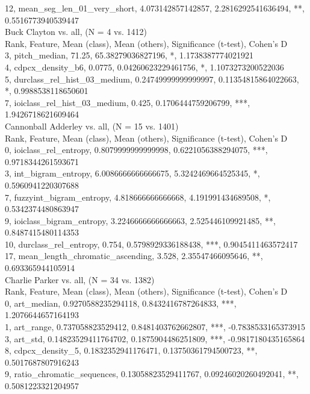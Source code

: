 12, mean_seg_len_01_very_short, 4.073142857142857, 2.2816292541636494, **, 0.5516773940539447\\
Buck Clayton vs. all, (N = 4 vs. 1412)\\
Rank, Feature, Mean (class), Mean (others), Significance (t-test), Cohen's D\\
3, pitch_median, 71.25, 65.38279036827196, *, 1.1738387774021921\\
4, cdpcx_density_b6, 0.0775, 0.04260623229461756, *, 1.1073273200522036\\
5, durclass_rel_hist_03_medium, 0.24749999999999997, 0.11354815864022663, *, 0.9988538118650601\\
7, ioiclass_rel_hist_03_medium, 0.425, 0.1706444759206799, ***, 1.9426718621609464\\
Cannonball Adderley vs. all, (N = 15 vs. 1401)\\
Rank, Feature, Mean (class), Mean (others), Significance (t-test), Cohen's D\\
0, ioiclass_rel_entropy, 0.8079999999999998, 0.6221056388294075, ***, 0.9718344261593671\\
3, int_bigram_entropy, 6.0086666666666675, 5.3242469664525345, *, 0.5960941220307688\\
7, fuzzyint_bigram_entropy, 4.818666666666668, 4.191991434689508, *, 0.5342374480863947\\
9, ioiclass_bigram_entropy, 3.2246666666666663, 2.525446109921485, **, 0.8487415480114353\\
10, durclass_rel_entropy, 0.754, 0.5798929336188438, ***, 0.9045411463572417\\
17, mean_length_chromatic_ascending, 3.528, 2.35547466095646, **, 0.693365944105914\\
Charlie Parker vs. all, (N = 34 vs. 1382)\\
Rank, Feature, Mean (class), Mean (others), Significance (t-test), Cohen's D\\
0, art_median, 0.9270588235294118, 0.8432416787264833, ***, 1.2076644657164193\\
1, art_range, 0.737058823529412, 0.8481403762662807, ***, -0.7838533165373915\\
3, art_std, 0.14823529411764702, 0.1875904486251809, ***, -0.9817180435165864\\
8, cdpcx_density_5, 0.1832352941176471, 0.13750361794500723, **, 0.5017687807916243\\
9, ratio_chromatic_sequences, 0.13058823529411767, 0.09246020260492041, **, 0.5081223321204957\\
